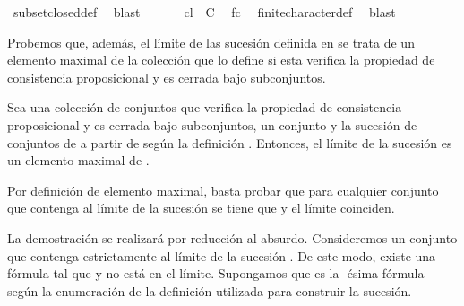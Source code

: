 \begin{isabellebody}
\ subset{\isacharunderscore}closed{\isacharunderscore}def\ \isamarkupfalse%
\ blast\isanewline
\ \ \isamarkupfalse%
\isanewline
\ \ \isamarkupfalse%
\ {\isachardoublequoteopen}{\isacharquery}cl\ {\isasymin}\ C{\isachardoublequoteclose}\ \isamarkupfalse%
\ fc\ \isamarkupfalse%
\ finite{\isacharunderscore}character{\isacharunderscore}def\ \isamarkupfalse%
\ blast\isanewline
{}\isamarkupfalse%
%
\endisatagproof
{\isafoldproof}%
%
\isadelimproof
%
\endisadelimproof
%
\begin{isamarkuptext}%
Probemos que, además, el límite de las sucesión definida en  se trata de un elemento 
  maximal de la colección que lo define si esta verifica la propiedad de consistencia proposicional
  y es cerrada bajo subconjuntos.

  \begin{lema}
    Sea  una colección de conjuntos que verifica la propiedad de consistencia proposicional y
    es cerrada bajo subconjuntos,  un conjunto y  la sucesión de conjuntos de  a partir 
    de  según la definición . Entonces, el límite de la sucesión  es un elemento 
    maximal de .
  \end{lema}

  \begin{demostracion}
    Por definición de elemento maximal, basta probar que para cualquier conjunto  que
    contenga al límite de la sucesión se tiene que  y el límite coinciden.

    La demostración se realizará por reducción al absurdo. Consideremos un conjunto  que 
    contenga estrictamente al límite de la sucesión . De este modo, existe una fórmula  tal 
    que  y  no está en el límite. Supongamos que  es la -ésima fórmula según la 
    enumeración de la definición  utilizada para construir la sucesión. 


\end{demostracion}
\end{isamarkuptext}
\end{isabellebody}
